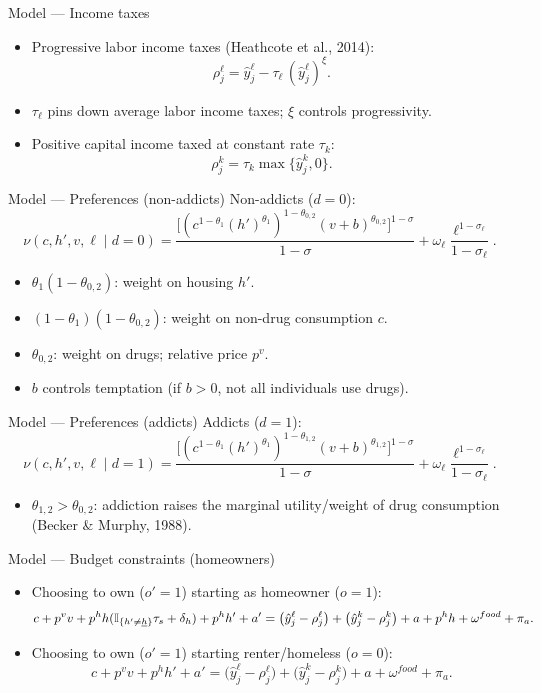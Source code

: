 \documentclass[10pt,aspectratio=169]{beamer}
\newcommand{\drug}{v}          %
\newcommand{\nondrug}{c}       %
\newcommand{\house}{h}         %
\newcommand{\leis}{\ell}       %
\newcommand{\uutil}{\nu}       %
\begin{document}
\begin{frame}{Model --- Income taxes}
\begin{itemize}
\item Progressive labor income taxes (Heathcote et al., 2014):
\[
\rho^{\leis}_j = \hat y^{\leis}_j - \tau_{\leis}\,(\hat y^{\leis}_j)^{\xi}.
\]
\item $\tau_{\leis}$ pins down average labor income taxes; $\xi$ controls progressivity.
\item Positive capital income taxed at constant rate $\tau_k$:
\[
\rho^k_j=\tau_k \max\{\hat y^k_j,0\}.
\]
\end{itemize}
\end{frame}

\begin{frame}{Model --- Preferences (non-addicts)}
\small
Non-addicts ($d=0$):
\[
\uutil(\nondrug,\house',\drug,\leis\mid d=0)=
\frac{\Big[(\nondrug^{1-\theta_1}(\house')^{\theta_1})^{1-\theta_{0,2}}(\drug+b)^{\theta_{0,2}}\Big]^{1-\sigma}}{1-\sigma}
+\omega_{\leis}\frac{\leis^{1-\sigma_{\leis}}}{1-\sigma_{\leis}}.
\]
\begin{itemize}
\item $\theta_1(1-\theta_{0,2})$: weight on housing $\house'$.
\item $(1-\theta_1)(1-\theta_{0,2})$: weight on non-drug consumption $\nondrug$.
\item $\theta_{0,2}$: weight on drugs; relative price $p^{v}$.
\item $b$ controls temptation (if $b>0$, not all individuals use drugs).
\end{itemize}
\end{frame}

\begin{frame}{Model --- Preferences (addicts)}
\small
Addicts ($d=1$):
\[
\uutil(\nondrug,\house',\drug,\leis\mid d=1)=
\frac{\Big[(\nondrug^{1-\theta_1}(\house')^{\theta_1})^{1-\theta_{1,2}}(\drug+b)^{\theta_{1,2}}\Big]^{1-\sigma}}{1-\sigma}
+\omega_{\leis}\frac{\leis^{1-\sigma_{\leis}}}{1-\sigma_{\leis}}.
\]
\begin{itemize}
\item $\theta_{1,2}>\theta_{0,2}$: addiction raises the marginal utility/weight of drug consumption (Becker \& Murphy, 1988).
\end{itemize}
\end{frame}

\begin{frame}{Model --- Budget constraints (homeowners)}
\small
\begin{itemize}
\item Choosing to own ($o'=1$) starting as homeowner ($o=1$):
\[
\nondrug + p^v \drug + p^h h(\mathbb{I}_{\{h'\neq \underline{h}\}}\tau_s + \delta_h) + p^h h' + a' \\
= \big(\hat y^{\leis}_j-\rho^{\leis}_j\big) + \big(\hat y^k_j-\rho^k_j\big) + a + p^h h + \omega^{food} + \pi_a.
\]
\item Choosing to own ($o'=1$) starting renter/homeless ($o=0$):
\[
\nondrug + p^v \drug + p^h h' + a'
= \big(\hat y^{\leis}_j-\rho^{\leis}_j\big) + \big(\hat y^k_j-\rho^k_j\big) + a + \omega^{food} + \pi_a.
\]
\end{itemize}
\end{frame}
\end{document}

